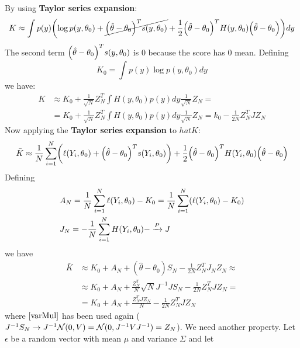\documentclass[12pt, letterpaper]{article}
\theoremstyle{definition}
\DeclarePairedDelimiter\autobracket{(}{)}
\newcommand{\br}[1]{\autobracket*{#1}}
\begin{document}
By using \textbf{Taylor series expansion}:
\begin{equation}
K \approx \int p(y) \br{\log p(y, \theta_0) + \cancel{\br{\hat{\theta} - \theta_0}^Ts(y,\theta_0)}+\frac{1}{2}\br{\hat{\theta} - \theta_0}^TH(y,\theta_0)\br{\hat{\theta} - \theta_0}} dy
\end{equation}
The second term $\br{\hat{\theta} - \theta_0}^Ts(y,\theta_0)$ is $0$ because the score has $0$ mean. Defining 
\begin{equation}
K_0  = \int  p(y) \log p(y, \theta_0)dy
\end{equation}
we have:
\begin{equation}
\begin{aligned}
K &\approx K_0 + \frac{1}{\sqrt{N}}Z_N^T \int H(y,\theta_0) p(y) dy \frac{1}{\sqrt{N}}Z_N  = \\
& =K_0 + \frac{1}{\sqrt{N}}Z_N^T \int H(y,\theta_0) p(y) dy \frac{1}{\sqrt{N}}Z_N = k_0 -\frac{1}{2N} Z_N^TJZ_N
\end{aligned}
\end{equation}
Now applying the \textbf{Taylor series expansion} to $hat{K}$:
\begin{equation}
\bar{K}  \approx \frac{1}{N} \sum_{i=1}^N \br{\ell(Y_i,\theta_0) + \br{\hat{\theta} - \theta_0}^Ts(Y_i,\theta_0)} + \frac{1}{2}\br{\hat{\theta} - \theta_0}^TH(Y_i,\theta_0)\br{\hat{\theta} - \theta_0}
\end{equation}
Defining 
\begin{equation}
\begin{aligned}
&A_N = \frac{1}{N} \sum_{i=1}^N \ell(Y_i, \theta_0) - K_0 = \frac{1}{N} \sum_{i=1}^N \br{\ell(Y_i, \theta_0) - K_0}\\
&J_N = -\frac{1}{N} \sum_{i=1}^NH(Y_i,\theta_0) - \xrightarrow{P} J
\end{aligned}
\end{equation}
we have
\begin{equation}
\begin{aligned}
\bar{K} &\approx K_0 + A_N + (\hat{\theta} - \theta_0)S_N -\frac{1}{2N} Z_N^TJ_NZ_N \approx\\
&\approx K_0 + A_N + \frac{Z_N^T}{N}\sqrt{N}J^{-1}JS_N -\frac{1}{2N} Z_N^TJZ_N  = \\
&= K_0 + A_N + \frac{Z_N^TJZ_N}{N} -\frac{1}{2N} Z_N^TJZ_N
\end{aligned}
\end{equation}
where $\ref{varMul}$ has been used again ($J^{-1}S_N \rightarrow J^{-1}\CMcal{N}(0,V)= \CMcal{N}(0,J^{-1}VJ^{-1}) = Z_N$).
We need another property. Let $\epsilon$ be a random vector with mean $\mu$ and variance $\Sigma$ and let
\end{document}
